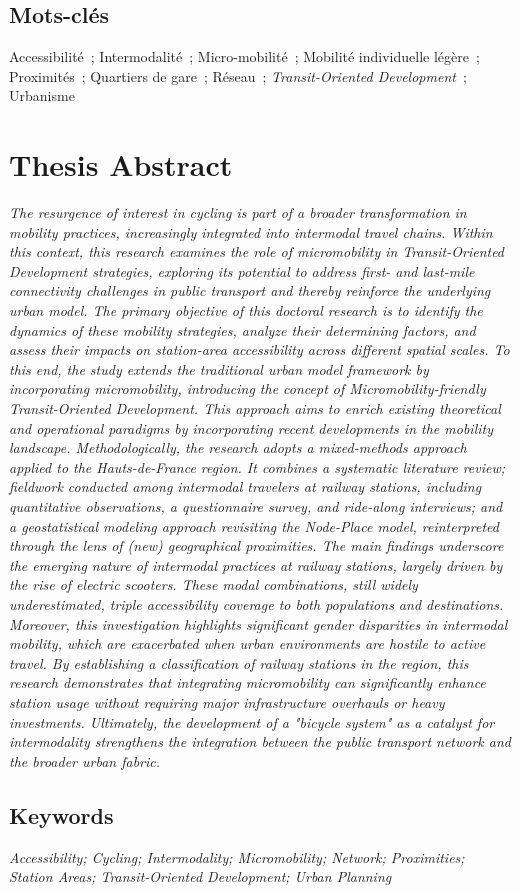 {%
\subsection*{Mots-clés}

\noindent
Accessibilité~; Intermodalité~; Micro-mobilité~; Mobilité individuelle légère~; Proximités~; Quartiers de gare~; Réseau~; \textsl{Transit-Oriented Development}~; Urbanisme

\section*{Thesis Abstract}

\footnotesize{\textsl{The resurgence of interest in cycling is part of a broader transformation in mobility practices, increasingly integrated into intermodal travel chains. Within this context, this research examines the role of micromobility in Transit-Oriented Development strategies, exploring its potential to address first- and last-mile connectivity challenges in public transport and thereby reinforce the underlying urban model. The primary objective of this doctoral research is to identify the dynamics of these mobility strategies, analyze their determining factors, and assess their impacts on station-area accessibility across different spatial scales. To this end, the study extends the traditional urban model framework by incorporating micromobility, introducing the concept of Micromobility-friendly Transit-Oriented Development. This approach aims to enrich existing theoretical and operational paradigms by incorporating recent developments in the mobility landscape. Methodologically, the research adopts a mixed-methods approach applied to the Hauts-de-France region. It combines a systematic literature review; fieldwork conducted among intermodal travelers at railway stations, including quantitative observations, a questionnaire survey, and ride-along interviews; and a geostatistical modeling approach revisiting the Node-Place model, reinterpreted through the lens of (new) geographical proximities. The main findings underscore the emerging nature of intermodal practices at railway stations, largely driven by the rise of electric scooters. These modal combinations, still widely underestimated, triple accessibility coverage to both populations and destinations. Moreover, this investigation highlights significant gender disparities in intermodal mobility, which are exacerbated when urban environments are hostile to active travel. By establishing a classification of railway stations in the region, this research demonstrates that integrating micromobility can significantly enhance station usage without requiring major infrastructure overhauls or heavy investments. Ultimately, the development of a "bicycle system" as a catalyst for intermodality strengthens the integration between the public transport network and the broader urban fabric.
    }}

\subsection*{Keywords}

\noindent
\textsl{Accessibility; Cycling; Intermodality; Micromobility; Network; Proximities; Station Areas; Transit-Oriented Development; Urban Planning}
}